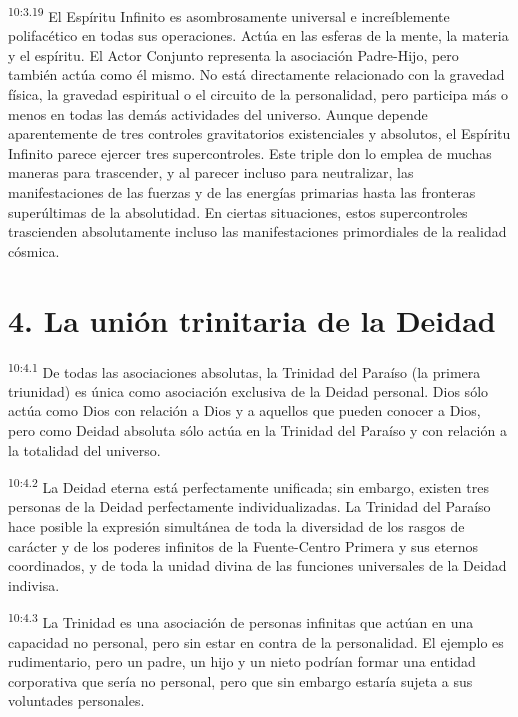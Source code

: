 \par
\textsuperscript{10:3.19} El Espíritu Infinito es asombrosamente universal e increíblemente polifacético en todas sus operaciones. Actúa en las esferas de la mente, la materia y el espíritu. El Actor Conjunto representa la asociación Padre-Hijo, pero también actúa como él mismo. No está directamente relacionado con la gravedad física, la gravedad espiritual o el circuito de la personalidad, pero participa más o menos en todas las demás actividades del universo. Aunque depende aparentemente de tres controles gravitatorios existenciales y absolutos, el Espíritu Infinito parece ejercer tres supercontroles. Este triple don lo emplea de muchas maneras para trascender, y al parecer incluso para neutralizar, las manifestaciones de las fuerzas y de las energías primarias hasta las fronteras superúltimas de la absolutidad. En ciertas situaciones, estos supercontroles trascienden absolutamente incluso las manifestaciones primordiales de la realidad cósmica.

\section*{4. La unión trinitaria de la Deidad}
\par
\textsuperscript{10:4.1} De todas las asociaciones absolutas, la Trinidad del Paraíso (la primera triunidad) es única como asociación exclusiva de la Deidad personal. Dios sólo actúa como Dios con relación a Dios y a aquellos que pueden conocer a Dios, pero como Deidad absoluta sólo actúa en la Trinidad del Paraíso y con relación a la totalidad del universo.

\par
\textsuperscript{10:4.2} La Deidad eterna está perfectamente unificada; sin embargo, existen tres personas de la Deidad perfectamente individualizadas. La Trinidad del Paraíso hace posible la expresión simultánea de toda la diversidad de los rasgos de carácter y de los poderes infinitos de la Fuente-Centro Primera y sus eternos coordinados, y de toda la unidad divina de las funciones universales de la Deidad indivisa.

\par
\textsuperscript{10:4.3} La Trinidad es una asociación de personas infinitas que actúan en una capacidad no personal, pero sin estar en contra de la personalidad. El ejemplo es rudimentario, pero un padre, un hijo y un nieto podrían formar una entidad corporativa que sería no personal, pero que sin embargo estaría sujeta a sus voluntades personales.


